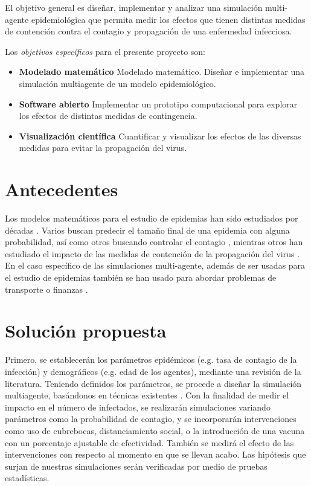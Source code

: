 \documentclass[a4]{sciposter}
\begin{document}
\begin{multicols}{2}
El objetivo general es diseñar, implementar y analizar una simulación multi-agente epidemiológica que permita medir los efectos que tienen distintas medidas de contención contra el contagio y propagación de una enfermedad infecciosa.\par
Los \emph{objetivos específicos} para el presente proyecto son:\par
\begin{itemize}
  \item \textbf{Modelado matemático} Modelado matemático. Diseñar e implementar una simulación multiagente de un modelo epidemiológico.
  \item \textbf{Software abierto} Implementar un prototipo computacional para explorar los efectos de distintas medidas de contingencia.
  \item \textbf{Visualización científica} Cuantificar y visualizar los efectos de las diversas medidas para evitar la propagación del virus.
\end{itemize}

\section{Antecedentes}
Los modelos matemáticos para el estudio de epidemias han sido estudiados por décadas \cite{decadas}. Varios buscan predecir el tamaño final de una epidemia con alguna probabilidad, así como otros buscando controlar el contagio \cite{contagio}, mientras otros han estudiado el impacto de las medidas de contención de la propagación del virus \cite{virus}. En el caso específico de las simulaciones multi-agente, además de ser usadas para el estudio de epidemias \cite{epidemias} también se han usado para abordar problemas de transporte \cite{transporte} o finanzas \cite{finanzas}. 



\section{Solución propuesta}

Primero, se establecerán los parámetros epidémicos (e.g. tasa de contagio de la infección) y demográficos (e.g. edad de los agentes), mediante una revisión de la literatura. Teniendo definidos los parámetros, se procede a diseñar la simulación multiagente, basándonos en técnicas existentes \cite{transporte}. Con la finalidad de medir el impacto en el número de infectados, se realizarán simulaciones variando parámetros como la probabilidad
de contagio, y se incorporarán intervenciones como uso de cubrebocas, distanciamiento social, o la introducción de una vacuna con un porcentaje ajustable de efectividad. También se medirá el efecto de las intervenciones con respecto al momento en que se llevan acabo. Las hipótesis que surjan de nuestras simulaciones serán verificadas por medio de pruebas estadísticas.


\end{multicols}
\end{document}

